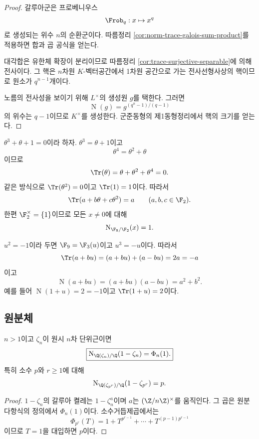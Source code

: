\begin{proof}
갈루아군은 프로베니우스
\[
  \Frob_q:x\mapsto x^q
\]
로 생성되는 위수 $n$의 순환군이다. 따름정리 \ref{cor:norm-trace-galois-sum-product}를 적용하면 합과 곱 공식을 얻는다.

대각합은 유한체 확장이 분리이므로 따름정리 \ref{cor:trace-surjective-separable}에 의해 전사이다. 그 핵은 $n$차원 $K$-벡터공간에서 1차원 공간으로 가는 전사선형사상의 핵이므로 원소가 $q^{n-1}$개이다.

노름의 전사성을 보이기 위해 $L^\times$의 생성원 $g$를 택한다. 그러면
\[
  \operatorname N(g)=g^{(q^n-1)/(q-1)}
\]
의 위수는 $q-1$이므로 $K^\times$를 생성한다. 군준동형의 제1동형정리에서 핵의 크기를 얻는다.
\end{proof}

\begin{example}[$\F_8/\F_2$]
$\theta^3+\theta+1=0$이라 하자. $\theta^3=\theta+1$이고
\[
  \theta^4=\theta^2+\theta
\]
이므로
\[
  \Tr(\theta)=\theta+\theta^2+\theta^4=0.
\]
같은 방식으로 $\Tr(\theta^2)=0$이고 $\Tr(1)=1$이다. 따라서
\[
  \Tr(a+b\theta+c\theta^2)=a
  \qquad(a,b,c\in\F_2).
\]
한편 $\F_2^\times=\{1\}$이므로 모든 $x\ne0$에 대해
\[
  \operatorname N_{\F_8/\F_2}(x)=1.
\]
\end{example}

\begin{example}[$\F_9/\F_3$]
$u^2=-1$이라 두면 $\F_9=\F_3(u)$이고 $u^3=-u$이다. 따라서
\[
  \Tr(a+bu)=(a+bu)+(a-bu)=2a=-a
\]
이고
\[
  \operatorname N(a+bu)=(a+bu)(a-bu)=a^2+b^2.
\]
예를 들어 $\operatorname N(1+u)=2=-1$이고 $\Tr(1+u)=2$이다.
\end{example}

\subsection{원분체}

\begin{proposition}
\label{prop:cyclotomic-norm-one-minus-zeta}
$n>1$이고 $\zeta_n$이 원시 $n$차 단위근이면
\[
  \boxed{
  \operatorname N_{\Q(\zeta_n)/\Q}(1-\zeta_n)
  =\Phi_n(1).}
\]
특히 소수 $p$와 $r\ge1$에 대해
\[
  \operatorname N_{\Q(\zeta_{p^r})/\Q}(1-\zeta_{p^r})=p.
\]
\end{proposition}

\begin{proof}
$1-\zeta_n$의 갈루아 켤레는 $1-\zeta_n^a$이며 $a$는 $(\Z/n\Z)^\times$를 움직인다. 그 곱은 원분다항식의 정의에서 $\Phi_n(1)$이다. 소수거듭제곱에서는
\[
  \Phi_{p^r}(T)
  =1+T^{p^{r-1}}+\cdots+T^{(p-1)p^{r-1}}
\]
이므로 $T=1$을 대입하면 $p$이다.
\end{proof}

